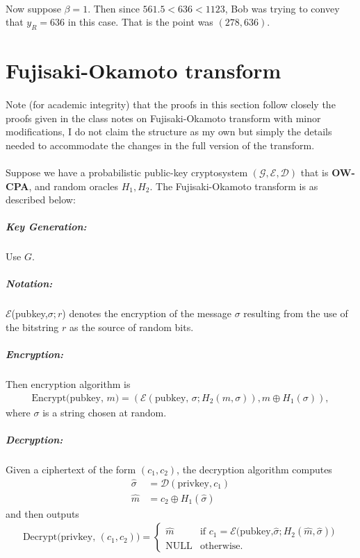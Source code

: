 \documentclass[letterpaper,12pt,oneside,onecolumn]{report}
\begin{document}
\paragraph{}
Now suppose $\beta = 1$. Then since $561.5 < 636 < 1123$, Bob was trying to convey that $y_R = 636$ in this case. That is the point was $(278, 636)$.
\section*{Fujisaki-Okamoto transform}
\paragraph{}
Note (for academic integrity) that the proofs in this section follow closely the proofs given in the class notes on Fujisaki-Okamoto transform with minor modifications, I do not claim the structure as my own but simply the details needed to accommodate the changes in the full version of the transform.
\paragraph{}
Suppose we have a probabilistic public-key cryptosystem $(\mathcal{G}, \mathcal{E}, \mathcal{D})$ that is \textbf{OW-CPA}, and random oracles $H_1, H_2$. The Fujisaki-Okamoto transform is as described below:
\subparagraph{Key Generation:}
Use $G$.
\subparagraph{Notation:}
$\mathcal{E}$(pubkey,$\sigma;r$) denotes the encryption of the message $\sigma$ resulting from the use of the bitstring $r$ as the source of random bits.
\subparagraph{Encryption:}
Then encryption algorithm is
\begin{align*}
\text{Encrypt(pubkey, }m) = (\mathcal{E}(\text{pubkey, }\sigma;H_2(m,\sigma)), m \oplus H_1(\sigma)),
\end{align*}
 where $\sigma$ is a string chosen at random.
 \subparagraph{Decryption:}
 Given a ciphertext of the form $(c_1,c_2)$, the decryption algorithm computes
 \begin{align*}
 \hat{\sigma} &= \mathcal{D}(\text{privkey},c_1) \\
 \hat{m} &= c_2 \oplus H_1(\hat{\sigma})
 \end{align*}
 and then outputs
 \begin{align*}
 \text{Decrypt(privkey, }(c_1,c_2)) = \begin{cases}
 \hat{m} &\text{if $c_1 = \mathcal{E}$(pubkey,$\hat{\sigma};H_2(\hat{m},\hat{\sigma}))$}\\
 \text{NULL} &\text{otherwise.}
 \end{cases}
 \end{align*}
\end{document}
